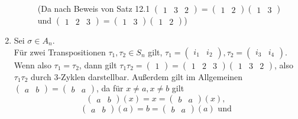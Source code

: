 \documentclass[sectionformat = aufgabe]{gadsescript}
\begin{document}
\begin{enumerate}[label=(\alph*)]
\begin{description}
				(Da nach Beweis von Satz 12.1 $ \begin{pmatrix} 1 & 3 & 2 \end{pmatrix} = \begin{pmatrix} 1 & 2 \end{pmatrix} \begin{pmatrix} 1 & 3 \end{pmatrix}  $ und $ \begin{pmatrix} 1 & 2 & 3 \end{pmatrix} = \begin{pmatrix} 1 & 3 \end{pmatrix} \begin{pmatrix} 1 & 2 \end{pmatrix}  $)
		\end{description}

	\item
		Sei $ \sigma \in A_n $.\\
		Für zwei Transpositionen $ \tau_1, \tau_2 \in S_n $ gilt, $ \tau_1 = \begin{pmatrix} i_1 & i_2 \end{pmatrix} , \tau_2 = \begin{pmatrix} i_3 & i_4 \end{pmatrix}  $.
		Wenn also $ \tau_1 = \tau_2 $, dann gilt $ \tau_1 \tau_2 = \begin{pmatrix} 1 \end{pmatrix} = \begin{pmatrix} 1 & 2 & 3 \end{pmatrix} \begin{pmatrix} 1 & 3 & 2 \end{pmatrix}  $, also $ \tau_1 \tau_2 $ durch 3-Zyklen darstellbar.
		Außerdem gilt im Allgemeinen $ \begin{pmatrix} a & b \end{pmatrix} = \begin{pmatrix} b & a \end{pmatrix} $, da für $ x \neq a, x \neq b $ gilt
		\[
			\begin{pmatrix} a & b \end{pmatrix} (x) = x = \begin{pmatrix} b & a \end{pmatrix}(x),
		\]
		\[
			\begin{pmatrix} a & b \end{pmatrix} (a) = b = \begin{pmatrix} b & a \end{pmatrix} (a) \text{ und} 
\]
\end{enumerate}
\end{document}
